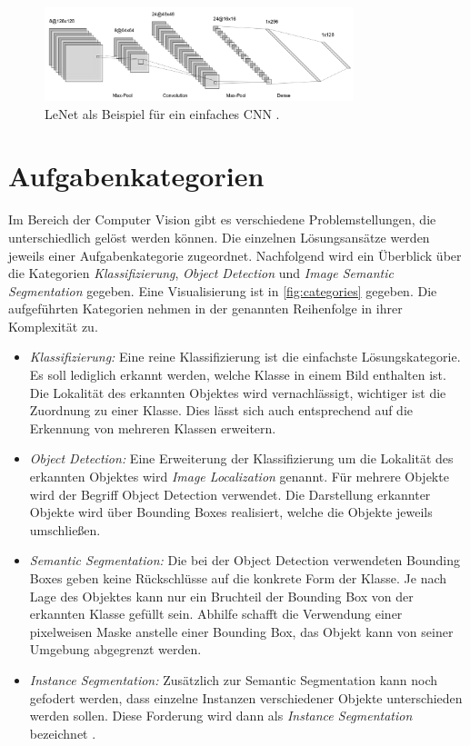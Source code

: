 \begin{figure}
	\centering
	\includegraphics[width=0.8\textwidth]{Bilder/LeNet.png} 
	\caption{LeNet als Beispiel für ein einfaches \ac{CNN} \cite{.17.12.2022}.}
	\label{fig:LeNet}
\end{figure}

\section{Aufgabenkategorien} \label{sec:aufgabenkategorien}
Im Bereich der Computer Vision gibt es verschiedene Problemstellungen, die unterschiedlich gelöst werden können.
Die einzelnen Lösungsansätze werden jeweils einer Aufgabenkategorie zugeordnet.
Nachfolgend wird ein Überblick über die Kategorien \textit{Klassifizierung}, \textit{Object Detection} und \textit{Image Semantic Segmentation} gegeben.
Eine Visualisierung ist in \autoref{fig:categories} gegeben.
Die aufgeführten Kategorien nehmen in der genannten Reihenfolge in ihrer Komplexität zu.

\begin{itemize}
	\item \textit{Klassifizierung:}
	Eine reine Klassifizierung ist die einfachste Lösungskategorie. 
	Es soll lediglich erkannt werden, welche Klasse in einem Bild enthalten ist.
	Die Lokalität des erkannten Objektes wird vernachlässigt, wichtiger ist die Zuordnung zu einer Klasse.
	Dies lässt sich auch entsprechend auf die Erkennung von mehreren Klassen erweitern.
	
	\item \textit{Object Detection:}
	Eine Erweiterung der Klassifizierung um die Lokalität des erkannten Objektes wird \textit{Image Localization} genannt.
	Für mehrere Objekte wird der Begriff Object Detection verwendet.
	Die Darstellung erkannter Objekte wird über Bounding Boxes realisiert, welche die Objekte jeweils umschließen.

	\item \textit{Semantic Segmentation:}
	Die bei der Object Detection verwendeten Bounding Boxes geben keine Rückschlüsse auf die konkrete Form der Klasse.
	Je nach Lage des Objektes kann nur ein Bruchteil der Bounding Box von der erkannten Klasse gefüllt sein.
	Abhilfe schafft die Verwendung einer pixelweisen Maske anstelle einer Bounding Box, das Objekt kann von seiner Umgebung abgegrenzt werden.

	\item \textit{Instance Segmentation:}
	Zusätzlich zur Semantic Segmentation kann noch gefodert werden, dass einzelne Instanzen verschiedener Objekte 
	unterschieden werden sollen.
	Diese Forderung wird dann als \textit{Instance Segmentation} bezeichnet \cite{Sharma.21.08.2019}.
\end{itemize}

